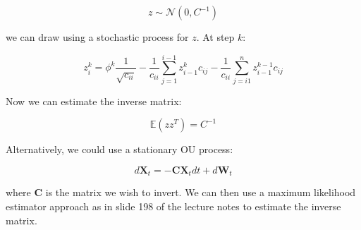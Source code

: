 \documentclass[11pt]{article} %
\begin{document}
\begin{equation}
	z \sim \mathcal{N}(0,C^{-1})
\end{equation}

we can draw using a stochastic process for $z$. At step $k$:

\begin{equation}
	z_{i}^{k} = \phi^{k}\frac{1}{\sqrt{c_{ii}}} - \frac{1}{c_{ii}}\sum^{i-1}_{j=1}z^{k}_{i-1}c_{ij} - \frac{1}{c_{ii}}\sum^{n}_{j=i1}z^{k-1}_{i-1}c_{ij}
\end{equation}

Now we can estimate the inverse matrix:

\begin{equation}
	\mathbb{E}(z z^{T}) = C^{-1}
\end{equation}

Alternatively, we could use a stationary OU process:

\begin{equation}
	d\mathbf{X}_{t} = -\mathbf{C}\mathbf{X}_{t}dt + d\mathbf{W}_{t}
\end{equation}

where $\mathbf{C}$ is the matrix we wish to invert. We can then use a maximum likelihood estimator approach as in slide 198 of the lecture notes to estimate the inverse matrix.
\end{document}

